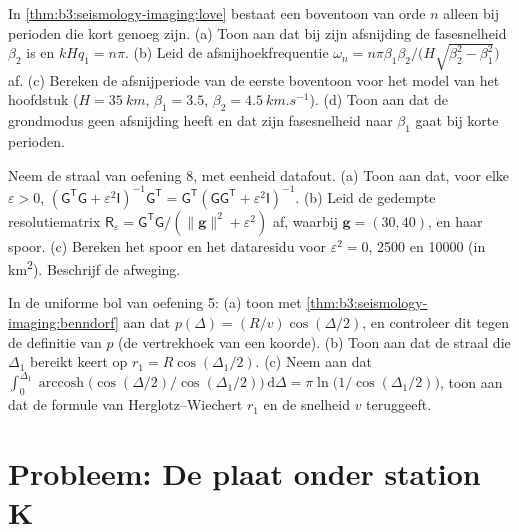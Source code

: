 \begin{exercise}[$\star\star\star$]\label{exo:b3:seismology-imaging:10}
In \cref{thm:b3:seismology-imaging:love} bestaat een boventoon van orde $n$ alleen
bij perioden die kort genoeg zijn. (a) Toon aan dat bij zijn afsnijding de
fasesnelheid $\beta_2$ is en $kHq_1 = n\pi$. (b) Leid de afsnijhoekfrequentie
$\omega_n = n\pi\beta_1\beta_2/\bigl(H\sqrt{\beta_2^2 - \beta_1^2}\bigr)$ af.
(c) Bereken de afsnijperiode van de eerste boventoon voor het model van het
hoofdstuk ($H = \qty{35}{km}$, $\beta_1 = 3.5$, $\beta_2 = \qty{4.5}{km.s^{-1}}$).
(d) Toon aan dat de grondmodus geen afsnijding heeft en dat zijn fasesnelheid
naar $\beta_1$ gaat bij korte perioden.
\end{exercise}

\begin{exercise}[$\star\star\star$]\label{exo:b3:seismology-imaging:11}
Neem de straal van oefening 8, met eenheid datafout. (a) Toon aan dat, voor elke
$\varepsilon > 0$, $(\mathsf G^{\mathsf T}\mathsf G + \varepsilon^2\mathsf
I)^{-1}\mathsf G^{\mathsf T} = \mathsf G^{\mathsf T}(\mathsf G\mathsf
G^{\mathsf T} + \varepsilon^2\mathsf I)^{-1}$. (b) Leid de gedempte resolutiematrix
$\mathsf R_\varepsilon = \mathsf G^{\mathsf T}\mathsf G/(\|\mathbf g\|^2 +
\varepsilon^2)$ af, waarbij $\mathbf g = (30, 40)$, en haar spoor. (c) Bereken het
spoor en het dataresidu voor $\varepsilon^2 = 0$, 2500 en \num{10000}
(in \unit{km^2}). Beschrijf de afweging.
\end{exercise}

\begin{exercise}[$\star\star\star$]\label{exo:b3:seismology-imaging:12}
In de uniforme bol van oefening 5: (a) toon met
\cref{thm:b3:seismology-imaging:benndorf} aan dat $p(\Delta) = (R/v)\cos(\Delta/2)$,
en controleer dit tegen de definitie van $p$ (de vertrekhoek van een koorde).
(b) Toon aan dat de straal die $\Delta_1$ bereikt keert op $r_1 = R\cos(\Delta_1/2)$.
(c) Neem aan dat $\int_0^{\Delta_1}\operatorname{arccosh}\bigl(\cos(\Delta/2)
/\cos(\Delta_1/2)\bigr)\,\mathrm d\Delta = \pi\ln\bigl(1/\cos(\Delta_1/2)\bigr)$,
toon aan dat de formule van Herglotz--Wiechert $r_1$ en de snelheid $v$ teruggeeft.
\end{exercise}

\section{Probleem: De plaat onder station K}

